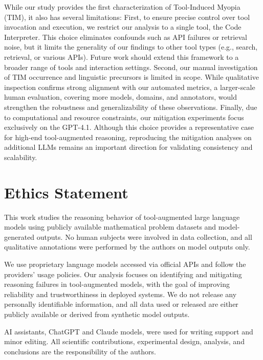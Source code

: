 \documentclass[11pt]{article}
\def \task{\textsc{TIM}\xspace}
\begin{document}
While our study provides the first characterization of Tool-Induced Myopia (\task{}), it also has several limitations:
% 
First, to ensure precise control over tool invocation and execution, we restrict our analysis to a single tool, the Code Interpreter. This choice eliminates confounds such as API failures or retrieval noise, but it limits the generality of our findings to other tool types (e.g., search, retrieval, or various APIs). Future work should extend this framework to a broader range of tools and interaction settings.
% 
Second, our manual investigation of \task{} occurrence and linguistic precursors is limited in scope. While qualitative inspection confirms strong alignment with our automated metrics, a larger-scale human evaluation, covering more models, domains, and annotators, would strengthen the robustness and generalizability of these observations.
% 
Finally, due to computational and resource constraints, our mitigation experiments focus exclusively on the GPT-4.1. Although this choice provides a representative case for high-end tool-augmented reasoning, reproducing the mitigation analyses on additional LLMs remains an important direction for validating consistency and scalability.

\section{Ethics Statement}

This work studies the reasoning behavior of tool-augmented large language models using publicly available mathematical problem datasets and model-generated outputs. No human subjects were involved in data collection, and all qualitative annotations were performed by the authors on model outputs only.

We use proprietary language models accessed via official APIs and follow the providers’ usage policies. Our analysis focuses on identifying and mitigating reasoning failures in tool-augmented models, with the goal of improving reliability and trustworthiness in deployed systems. We do not release any personally identifiable information, and all data used or released are either publicly available or derived from synthetic model outputs.

AI assistants, ChatGPT and Claude models, were used for writing support and minor editing. All scientific contributions, experimental design, analysis, and conclusions are the responsibility of the authors.

%

\end{document}
